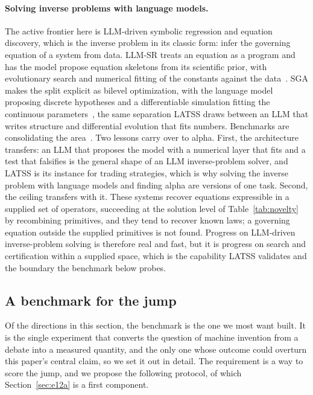 \documentclass[11pt]{article}
\begin{document}
\paragraph{Solving inverse problems with language models.} The active frontier here is LLM-driven
symbolic regression and equation discovery, which is the inverse problem in its classic form: infer the
governing equation of a system from data. LLM-SR treats an equation as a program and has the model
propose equation skeletons from its scientific prior, with evolutionary search and numerical fitting of
the constants against the data~\cite{llmsr}. SGA makes the split explicit as bilevel optimization, with
the language model proposing discrete hypotheses and a differentiable simulation fitting the continuous
parameters~\cite{sga}, the same separation LATSS draws between an LLM that writes structure and
differential evolution that fits numbers. Benchmarks are consolidating the area~\cite{llmsrbench}. Two lessons carry over to alpha. First, the architecture transfers: an LLM that
proposes the model with a numerical layer that fits and a test that falsifies is the general shape of an
LLM inverse-problem solver, and LATSS is its instance for trading strategies, which is why solving the
inverse problem with language models and finding alpha are versions of one task. Second, the ceiling
transfers with it. These systems recover equations expressible in a supplied set of operators,
succeeding at the solution level of Table~\ref{tab:novelty} by recombining primitives, and they tend to
recover known laws; a governing equation outside the supplied primitives is not found. Progress on
LLM-driven inverse-problem solving is therefore real and fast, but it is progress on search and
certification within a supplied space, which is the capability LATSS validates and the boundary the
benchmark below probes.

\subsection{A benchmark for the jump}
\label{sec:jumpbench}

Of the directions in this section, the benchmark is the one we most want built. It is the single
experiment that converts the question of machine invention from a debate into a measured quantity, and
the only one whose outcome could overturn this paper's central claim, so we set it out in detail. The
requirement is a way to score the jump, and we propose the following protocol, of which
Section~\ref{sec:e12a} is a first component.
\end{document}
